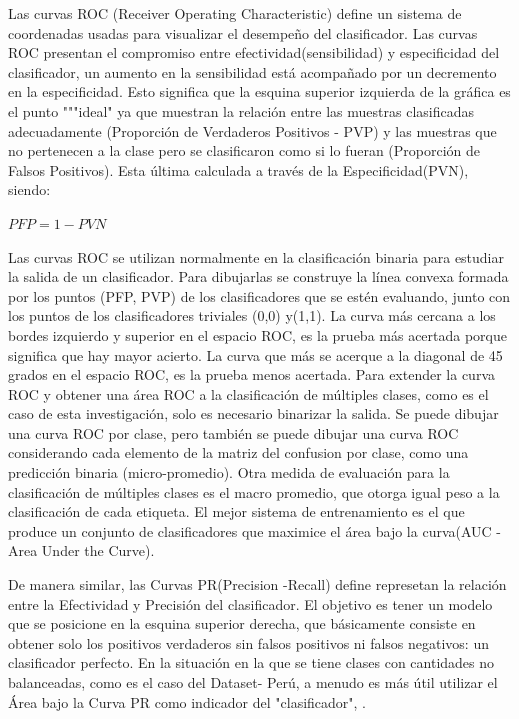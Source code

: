 	
	Las curvas ROC (Receiver Operating Characteristic) define un sistema de coordenadas usadas para visualizar el desempeño del clasificador. Las curvas ROC presentan el compromiso entre efectividad(sensibilidad) y especificidad del clasificador, un aumento en la sensibilidad está acompañado por un decremento en la especificidad. Esto significa que la esquina superior izquierda de la gráfica es el punto """ideal" ya que muestran la relación entre las muestras clasificadas adecuadamente (Proporción de Verdaderos Positivos - PVP) y las muestras que no pertenecen a la clase pero se clasificaron como si lo fueran (Proporción de Falsos Positivos). Esta última calculada a través de la Especificidad(PVN), siendo:
	\begin{center}
	{$PFP= 1 - PVN$}
	\end{center}

	Las curvas ROC se utilizan normalmente en la clasificación binaria para estudiar la salida de un clasificador. Para dibujarlas se construye la línea convexa formada por los puntos (PFP, PVP) de los clasificadores que se estén evaluando, junto con los puntos de los clasificadores triviales (0,0) y(1,1). La curva más cercana a los bordes izquierdo y superior en el espacio ROC, es la prueba más acertada porque significa que hay mayor acierto. La curva que más se acerque a la diagonal de 45 grados en el espacio ROC, es la prueba menos acertada. Para extender la curva ROC y obtener una área ROC a la clasificación de múltiples clases, como es el caso de esta investigación, solo es necesario binarizar la salida. Se puede dibujar una curva ROC por clase, pero también se puede dibujar una curva ROC considerando cada elemento de la matriz del confusion por clase, como una predicción binaria (micro-promedio). Otra medida de evaluación para la clasificación de múltiples clases es el macro promedio, que otorga igual peso a la clasificación de cada etiqueta. El mejor sistema de entrenamiento es el que produce un conjunto de clasificadores que maximice el área bajo la curva(AUC - Area Under the Curve)\citep{SandovalCereza}.


	De manera similar, las Curvas PR(Precision -Recall) define represetan la relación entre la Efectividad y Precisión del clasificador. El objetivo es tener un modelo que se posicione en la esquina superior derecha, que básicamente consiste en obtener solo los positivos verdaderos sin falsos positivos ni falsos negativos: un clasificador perfecto. En la situación en la que se tiene clases con cantidades no balanceadas, como es el caso del Dataset- Perú, a menudo es más útil utilizar el Área bajo la Curva PR como indicador del "clasificador", \citep{Davis-2006-RPR-1143844-1143874}.


